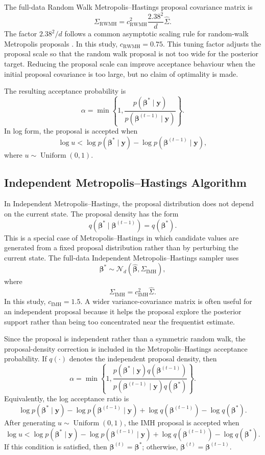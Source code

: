 The full-data Random Walk Metropolis--Hastings proposal covariance matrix is
\[
\Sigma_{\mathrm{RWMH}}
=
c_{\mathrm{RWMH}}^2
\frac{2.38^2}{d}
\widehat{\Sigma}.
\]
The factor $2.38^2/d$ follows a common asymptotic scaling rule for random-walk Metropolis proposals \cite{roberts1997weak}. In this study, $c_{\mathrm{RWMH}}=0.75$. This tuning factor adjusts the proposal scale so that the random walk proposal is not too wide for the posterior target. Reducing the proposal scale can improve acceptance behaviour when the initial proposal covariance is too large, but no claim of optimality is made.

The resulting acceptance probability is
\[
\alpha
=
\min\left\{
1,
\frac{
p(\boldsymbol{\beta}^{*}\mid \mathbf{y})
}{
p(\boldsymbol{\beta}^{(t-1)}\mid \mathbf{y})
}
\right\}.
\]
In log form, the proposal is accepted when
\[
\log u
<
\log p(\boldsymbol{\beta}^{*}\mid \mathbf{y})
-
\log p(\boldsymbol{\beta}^{(t-1)}\mid \mathbf{y}),
\]
where $u \sim \operatorname{Uniform}(0,1)$.

\subsection{Independent Metropolis--Hastings Algorithm}

In Independent Metropolis--Hastings, the proposal distribution does not depend on the current state. The proposal density has the form
\[
q(\boldsymbol{\beta}^{*}\mid \boldsymbol{\beta}^{(t-1)})
=
q(\boldsymbol{\beta}^{*}).
\]
This is a special case of Metropolis--Hastings in which candidate values are generated from a fixed proposal distribution rather than by perturbing the current state. The full-data Independent Metropolis--Hastings sampler uses
\[
\boldsymbol{\beta}^{*}
\sim
\mathcal{N}_d(
\widehat{\boldsymbol{\beta}},
\Sigma_{\mathrm{IMH}}
),
\]
where
\[
\Sigma_{\mathrm{IMH}}
=
c_{\mathrm{IMH}}^2
\widehat{\Sigma}.
\]
In this study, $c_{\mathrm{IMH}}=1.5$. A wider variance-covariance matrix is often useful for an independent proposal because it helps the proposal explore the posterior support rather than being too concentrated near the frequentist estimate.

Since the proposal is independent rather than a symmetric random walk, the proposal-density correction is included in the Metropolis--Hastings acceptance probability. If $q(\cdot)$ denotes the independent proposal density, then
\[
\alpha
=
\min\left\{
1,
\frac{
p(\boldsymbol{\beta}^{*}\mid \mathbf{y})q(\boldsymbol{\beta}^{(t-1)})
}{
p(\boldsymbol{\beta}^{(t-1)}\mid \mathbf{y})q(\boldsymbol{\beta}^{*})
}
\right\}.
\]
Equivalently, the log acceptance ratio is
\[
\log p(\boldsymbol{\beta}^{*}\mid \mathbf{y})
-
\log p(\boldsymbol{\beta}^{(t-1)}\mid \mathbf{y})
+
\log q(\boldsymbol{\beta}^{(t-1)})
-
\log q(\boldsymbol{\beta}^{*}).
\]
After generating $u\sim\operatorname{Uniform}(0,1)$, the IMH proposal is accepted when
\[
\log u
<
\log p(\boldsymbol{\beta}^{*}\mid \mathbf{y})
-
\log p(\boldsymbol{\beta}^{(t-1)}\mid \mathbf{y})
+
\log q(\boldsymbol{\beta}^{(t-1)})
-
\log q(\boldsymbol{\beta}^{*}).
\]
If this condition is satisfied, then $\boldsymbol{\beta}^{(t)}=\boldsymbol{\beta}^{*}$; otherwise, $\boldsymbol{\beta}^{(t)}=\boldsymbol{\beta}^{(t-1)}$.

